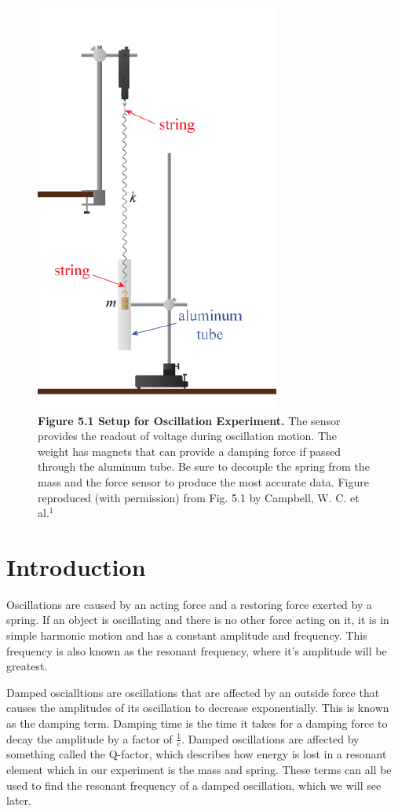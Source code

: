 \documentclass[11pt]{report}
\begin{document}
\newpage
\begin{figure}[h!]
    \includegraphics[]{setup.png}
    \captionsetup{labelformat=empty}
    \caption{\textbf{Figure 5.1 Setup for Oscillation Experiment.}  The sensor
    provides the readout of voltage during oscillation motion.  The weight has
    magnets that can provide a damping force if passed through the aluminum
    tube.  Be sure to decouple the spring from the mass and the force sensor to
    produce the most accurate data.  Figure
reproduced (with permission) from Fig. 5.1 by Campbell, W. C. et al.$^1$}
\end{figure}

\newpage
\section*{Introduction}
Oscillations are caused by an acting force and a restoring force exerted by a
spring. If an object is oscillating and there is no other force acting on it, it
is in simple harmonic motion and has a constant amplitude and frequency.  This
frequency is also known as the resonant frequency, where it's amplitude will be
greatest.  

Damped oscialltions are oscillations that are affected by an outside force that
causes the amplitudes of its oscillation to decrease exponentially.  This is
known as the damping term.  Damping time is the time it takes for a damping
force to decay the amplitude by a factor of \(\frac{1}{e}\).  Damped
oscillations are affected by something called the Q-factor, which describes how
energy is lost in a resonant element which in our experiment is the mass and
spring.  These terms can all be used to find the resonant frequency of a damped
oscillation, which we will see later.  
\end{document}
